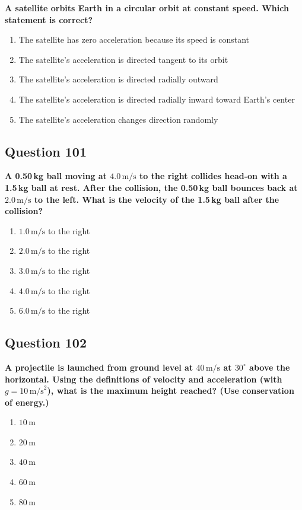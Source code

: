 \documentclass[12pt,letterpaper]{article}
\begin{document}
\begin{questionbox}
\textbf{A satellite orbits Earth in a circular orbit at constant speed. Which statement is correct?}

\begin{enumerate}[label=\alph*)]
    \item The satellite has zero acceleration because its speed is constant
    \item The satellite's acceleration is directed tangent to its orbit
    \item The satellite's acceleration is directed radially outward
    \item The satellite's acceleration is directed radially inward toward Earth's center
    \item The satellite's acceleration changes direction randomly
\end{enumerate}
\end{questionbox}

\subsection{Question 101}

\begin{questionbox}
\textbf{A 0.50\,kg ball moving at $4.0\,\text{m/s}$ to the right collides head-on with a 1.5\,kg ball at rest. After the collision, the 0.50\,kg ball bounces back at $2.0\,\text{m/s}$ to the left. What is the velocity of the 1.5\,kg ball after the collision?}

\begin{enumerate}[label=\alph*)]
    \item $1.0\,\text{m/s}$ to the right
    \item $2.0\,\text{m/s}$ to the right
    \item $3.0\,\text{m/s}$ to the right
    \item $4.0\,\text{m/s}$ to the right
    \item $6.0\,\text{m/s}$ to the right
\end{enumerate}
\end{questionbox}

\subsection{Question 102}

\begin{questionbox}
\textbf{A projectile is launched from ground level at $40\,\text{m/s}$ at $30^\circ$ above the horizontal. Using the definitions of velocity and acceleration (with $g = 10\,\text{m/s}^2$), what is the maximum height reached? (Use conservation of energy.)}

\begin{enumerate}[label=\alph*)]
    \item $10\,\text{m}$
    \item $20\,\text{m}$
    \item $40\,\text{m}$
    \item $60\,\text{m}$
    \item $80\,\text{m}$
\end{enumerate}
\end{questionbox}
\end{document}
